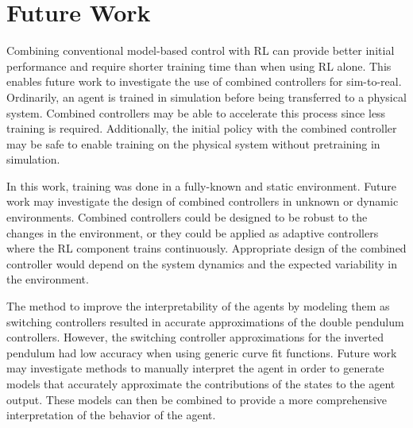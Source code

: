\section{Future Work}

Combining conventional model-based control with RL can provide better initial performance and require shorter training time than when using RL alone. This enables future work to investigate the use of combined controllers for sim-to-real. Ordinarily, an agent is trained in simulation before being transferred to a physical system. Combined controllers may be able to accelerate this process since less training is required. Additionally, the initial policy with the combined controller may be safe to enable training on the physical system without pretraining in simulation.

In this work, training was done in a fully-known and static environment. Future work may investigate the design of combined controllers in unknown or dynamic environments. Combined controllers could be designed to be robust to the changes in the environment, or they could be applied as adaptive controllers where the RL component trains continuously. Appropriate design of the combined controller would depend on the system dynamics and the expected variability in the environment.

The method to improve the interpretability of the agents by modeling them as switching controllers resulted in accurate approximations of the double pendulum controllers. However, the switching controller approximations for the inverted pendulum had low accuracy when using generic curve fit functions. Future work may investigate methods to manually interpret the agent in order to generate models that accurately approximate the contributions of the states to the agent output. These models can then be combined to provide a more comprehensive interpretation of the behavior of the agent.

